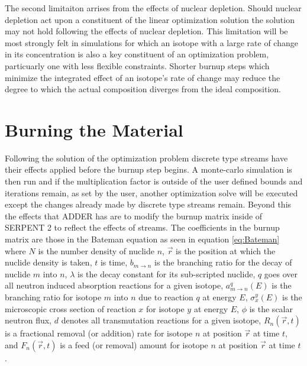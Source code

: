 \documentclass[]{elsarticle}
\begin{document}
The second limitaiton arrises from the effects of nuclear depletion. Should
nuclear depletion act upon a constituent of the linear optimization solution
the solution may not hold following the effects of nuclear depletion. This
limitation will be most strongly felt in simulations for which an isotope
with a large rate of change in its concentration is also a key constituent of
an optimization problem, particuarly one with less flexible constraints. Shorter
burnup steps which minimize the integrated effect of an isotope's rate of change
may reduce the degree to which the actual composition diverges from the ideal
composition.

\section{Burning the Material}
Following the solution of the optimization problem discrete type streams have
their effects applied before the burnup step begins. A monte-carlo simulation is
then run and if the multiplication factor is outside of the user defined bounds
and iterations remain, as set by the user, another optimization solve will be
executed except the changes already made by discrete type streams remain. 
Beyond this the effects that ADDER has are to modify the burnup matrix inside of
SERPENT 2 to reflect the effects of streams. The coefficients in the burnup
matrix are those in the Bateman equation as seen in equation \ref{eq:Bateman}
where $N$ is the number density of nuclide $n$, $\vec{r}$ is the position at
which the nuclide density is taken, $t$ is time, $b_{m \to n}$ is the branching ratio for the decay of nuclide $m$ into $n$, $\lambda$ is the decay constant
for its sub-scripted nuclide,
$q$ goes over all neutron induced absorption reactions for a given isotope, 
$a_{m \to n}^{q}(E)$ is the branching ratio for isotope $m$ into $n$ due to
reaction $q$ at energy $E$,  $\sigma_{x}^{y}(E)$ is the microscopic
cross section of reaction $x$ for isotope $y$ at energy $E$, $\phi$ is the
scalar neutron flux, $d$ denotes all
transmutation reactions for a given isotope, $R_{n}(\vec{r},t)$ is a
fractional removal (or addition) rate for isotope $n$ at position $\vec{r}$ at
time $t$, and $F_{n}(\vec{r},t)$ is a feed (or removal) amount for isotope
$n$ at position $\vec{r}$ at time $t$. 
\end{document}
